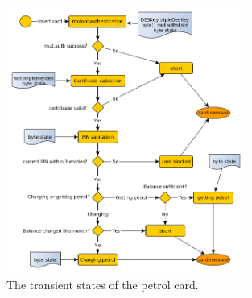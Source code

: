 \begin{figure}[!ht]
  \centering
    \includegraphics[width=0.7\textwidth]{transient}
      \caption{The transient states of the petrol card.}
\end{figure}